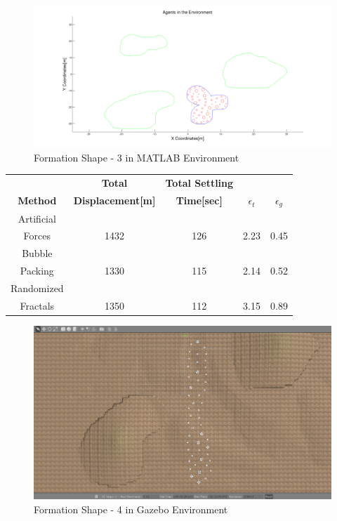 \begin{figure}[H]
\caption{Formation Shape - 3 in MATLAB Environment}
\centerline{\includegraphics[scale = 0.32]{3}}
\end{figure} 
				 

			
			
\begin{center}
 \label{perf_shape3} 
\begin{tabular}{|c|c|c|c|c|}
					
\hline
\textbf{} & \textbf{Total}  & \textbf{Total Settling} & \textbf{} & \textbf{} \\ \textbf{Method} & \textbf{Displacement[m]} & \textbf{Time[sec]}& \textbf{$\epsilon_t$} & \textbf{$\epsilon_g$} \\
\hline
Artificial&  &  &  & \\
 Forces & 1432 & 126& 2.23 & 0.45\\
 \hline
 Bubble&  &  &  & \\
 Packing &1330 &115 &2.14 & 0.52\\
\hline
 Randomized&  &  &  & \\
 Fractals &1350 &112 &3.15 & 0.89\\
\hline
\end{tabular}
\end{center}

				 
\begin{figure}[H]
\caption{Formation Shape - 4 in Gazebo Environment}
\centerline{\includegraphics[scale = 0.32]{4_Gazebo}}
\end{figure} 
			
